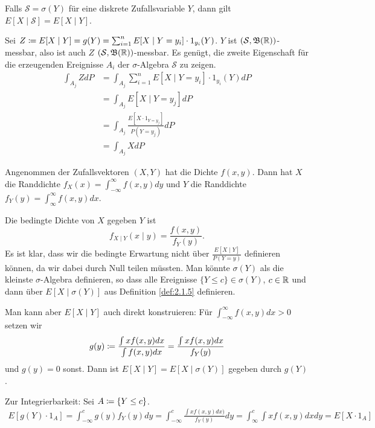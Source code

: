 \documentclass[a4paper,twoside,DIV15,BCOR12mm]{scrbook}
\newcommand{\borel}{{\mathfrak B}}
\begin{document}
\begin{lemma}
Falls $\mathcal S=\sigma(Y)$ für eine diskrete Zufallsvariable $Y$, dann gilt $E[X\mid \mathcal S] = E[X\mid Y]$.
\end{lemma}

\begin{beweis}
Sei $Z\da E[X\mid Y] = g(Y) = \sum_{i=1}^n E[X\mid Y = y_i] \cdot 1_{y_i}(Y)$. $Y$ ist $(\mathcal S,\borel(\MdR))$-messbar, also ist auch $Z$ $(\mathcal S,\borel(\MdR))$-messbar. Es genügt, die zweite Eigenschaft für die erzeugenden Ereignisse $A_i$ der $\sigma$-Algebra $\mathcal S$ zu zeigen.
\begin{align*}
\int_{A_j}Zd P &= \int_{A_j} \sum_{i=1}^n E[X\mid Y=y_i]\cdot 1_{y_i}(Y)dP \\
&= \int_{A_j} E[X \mid Y=y_j] dP \\
&= \int_{A_j} \frac{E[X\cdot 1_{Y=y_j}]}{P(Y=y_j)} dP \\
&= \int_{A_j} X dP
\end{align*}
\end{beweis}

\begin{bemerkung}
Angenommen der Zufallsvektoren $(X,Y)$ hat die Dichte $f(x,y)$. Dann hat $X$ die Randdichte $f_X(x) = \int_{-\infty}^\infty f(x,y)dy$ und $Y$ die Randdichte $f_Y(y)=\int_{\infty}^\infty f(x,y)dx$.

Die bedingte Dichte von $X$ gegeben $Y$ ist 
\[
f_{X\mid Y} (x\mid y) = \frac{f(x,y)}{f_Y(y)}.
\]
Es ist klar, dass wir die bedingte Erwartung nicht über $\frac{E[X\mid Y]}{P(Y=y)}$ definieren können, da wir dabei durch Null teilen müssten. Man könnte $\sigma(Y)$ als die kleinste $\sigma$-Algebra definieren, so dass alle Ereignisse $\{Y\le c\}\in\sigma(Y)$, $c\in\mathbb{R}$ und dann über $E[X\mid \sigma(Y)]$ aus Definition \ref{def:2.1.5} definieren.

Man kann aber $E[X\mid Y]$ auch direkt konstruieren: Für $\int_{-\infty}^\infty f(x,y)dx > 0$ setzen wir 
\[
g(y) \da \frac{\int x f(x,y)dx}{\int f(x,y)dx} = 
\frac{\int x f(x,y)dx}{f_Y(y)}
\]
und $g(y) = 0$ sonst. Dann ist $E[X\mid Y] = E[X\mid \sigma(Y)]$ gegeben durch $g(Y)$.

Zur Integrierbarkeit: Sei $A\da \{Y\le c\}$.
\begin{align*}
E[g(Y)\cdot 1_A] = \int_{-\infty}^c g(y) f_Y(y)dy = \int_{-\infty}^c \frac{\int x f(x,y)dx)}{f_Y(y)} dy = \int_{\infty}^c \int x f(x,y)dxdy = E[X\cdot 1_A]
\end{align*}
\end{bemerkung}
\end{document}
